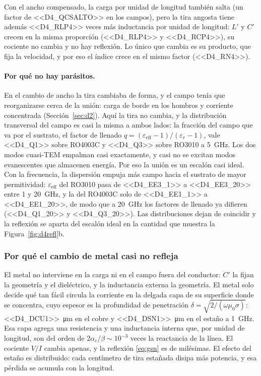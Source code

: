 \documentclass[11pt,letterpaper]{article}
\begin{document}
Con el ancho compensado, la carga por unidad de longitud también salta (un factor de <<D4_QCSALTO>> en los campos), pero la tira angosta tiene además <<D4_RLP4>> veces más inductancia por unidad de longitud: $L'$ y $C'$ crecen en la misma proporción (<<D4_RLP4>> y <<D4_RCP4>>), su cociente no cambia y no hay reflexión. Lo único que cambia es su producto, que fija la velocidad, y por eso el índice crece en el mismo factor (<<D4_RN4>>).

\paragraph{Por qué no hay parásitos.} En el cambio de ancho la tira cambiaba de forma, y el campo tenía que reorganizarse cerca de la unión: carga de borde en los hombros y corriente concentrada (Sección~\ref{sec:d2}). Aquí la tira no cambia, y la distribución transversal del campo es casi la misma a ambos lados: la fracción del campo que va por el sustrato, el factor de llenado $q=(\varepsilon_{\mathrm{eff}}-1)/(\varepsilon_r-1)$, vale <<D4_Q1>> sobre RO4003C y <<D4_Q3>> sobre RO3010 a \SI{5}{GHz}. Los dos modos cuasi-TEM empalman casi exactamente, y casi no se excitan modos evanescentes que almacenen energía. Por eso la unión es un escalón casi ideal. Con la frecuencia, la dispersión empuja más campo hacia el sustrato de mayor permitividad: $\varepsilon_{\mathrm{eff}}$ del RO3010 pasa de <<D4_EE3_1>> a <<D4_EE3_20>> entre 1 y \SI{20}{GHz}, y la del RO4003C solo de <<D4_EE1_1>> a <<D4_EE1_20>>, de modo que a \SI{20}{GHz} los factores de llenado ya difieren (<<D4_Q1_20>> y <<D4_Q3_20>>). Las distribuciones dejan de coincidir y la reflexión se aparta del escalón ideal en la cantidad que muestra la Figura~\ref{fig:d4refl}b.

\subsubsection{Por qué el cambio de metal casi no refleja}
El metal no interviene en la carga ni en el campo fuera del conductor: $C'$ la fijan la geometría y el dieléctrico, y la inductancia externa la geometría. El metal solo decide qué tan fácil circula la corriente en la delgada capa de su superficie donde se concentra, cuyo espesor es la profundidad de penetración $\delta=\sqrt{2/(\omega\mu_0\sigma)}$: \SI{<<D4_DCU1>>}{\micro\metre} en el cobre y \SI{<<D4_DSN1>>}{\micro\metre} en el estaño a \SI{1}{GHz}. Esa capa agrega una resistencia y una inductancia interna que, por unidad de longitud, son del orden de $2\alpha_c/\beta\sim 10^{-3}$ veces la reactancia de la línea. El cociente $V/I$ cambia apenas, y la reflexión \eqref{eq:gsn} es de milésimas. El efecto del estaño es distribuido: cada centímetro de tira estañada disipa más potencia, y esa pérdida se acumula con la longitud.
\end{document}
